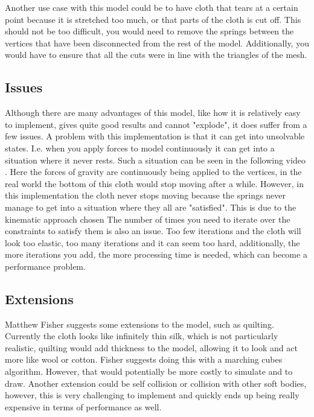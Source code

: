 Another use case with this model could be to have cloth that tears at a certain point because it is stretched too much,
or that parts of the cloth is cut off. This should not be too difficult, you would need to remove the springs between
the vertices that have been disconnected from the rest of the model.
Additionally, you would have to ensure that all the cuts were in line with the triangles of the mesh.

\subsection{Issues}
Although there are many advantages of this model, like how it is relatively easy to implement, gives quite good results and cannot "explode", it does suffer from a few issues.
A problem with this implementation is that it can get into unsolvable states.
I.e. when you apply forces to model continuously it can get into a situation where it never rests.
Such a situation can be seen in the following video .
Here the forces of gravity are continuously being applied to the vertices, in the real world the bottom
of this cloth would stop moving after a while. However, in this implementation the cloth never stops moving
because the springs never manage to get into a situation where they all are "satisfied".
This is due to the kinematic approach chosen\cite{math_for_games}
The number of times you need to iterate over the constraints to satisfy them is also an issue.
Too few iterations and the cloth will look too elastic, too many iterations and it can seem too hard,
additionally, the more iterations you add, the more processing time is needed, which can become a performance problem.

\subsection{Extensions}
Matthew Fisher\cite{matthew_fisher} suggests some extensions to the model,
such as quilting. Currently the cloth looks like infinitely thin silk, which is not particularly realistic,
quilting would add thickness to the model, allowing it to look and act more like wool or cotton. 
Fisher suggests doing this with a marching cubes algorithm.
However, that would potentially be more costly to simulate and to draw.
Another extension could be self collision or collision with other soft bodies, however, this is very challenging to implement
and quickly ends up being really expensive in terms of performance as well.




